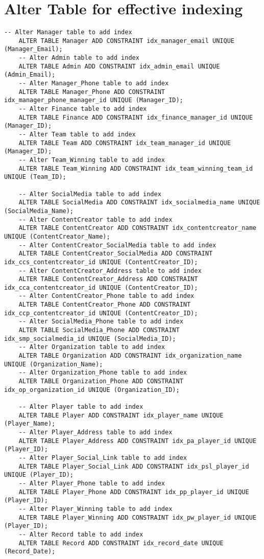 \section[Alter Table]{Alter Table for effective indexing}
\hrulefill
\begin{lstlisting}[caption={Alter Table},label={lst:alter-table}]
    -- Alter Manager table to add index
    ALTER TABLE Manager ADD CONSTRAINT idx_manager_email UNIQUE (Manager_Email);
    -- Alter Admin table to add index
    ALTER TABLE Admin ADD CONSTRAINT idx_admin_email UNIQUE (Admin_Email);
    -- Alter Manager_Phone table to add index
    ALTER TABLE Manager_Phone ADD CONSTRAINT idx_manager_phone_manager_id UNIQUE (Manager_ID);
    -- Alter Finance table to add index
    ALTER TABLE Finance ADD CONSTRAINT idx_finance_manager_id UNIQUE (Manager_ID);
    -- Alter Team table to add index
    ALTER TABLE Team ADD CONSTRAINT idx_team_manager_id UNIQUE (Manager_ID);
    -- Alter Team_Winning table to add index
    ALTER TABLE Team_Winning ADD CONSTRAINT idx_team_winning_team_id UNIQUE (Team_ID);
    
    -- Alter SocialMedia table to add index
    ALTER TABLE SocialMedia ADD CONSTRAINT idx_socialmedia_name UNIQUE (SocialMedia_Name);
    -- Alter ContentCreator table to add index
    ALTER TABLE ContentCreator ADD CONSTRAINT idx_contentcreator_name UNIQUE (ContentCreator_Name);
    -- Alter ContentCreator_SocialMedia table to add index
    ALTER TABLE ContentCreator_SocialMedia ADD CONSTRAINT idx_ccs_contentcreator_id UNIQUE (ContentCreator_ID);
    -- Alter ContentCreator_Address table to add index
    ALTER TABLE ContentCreator_Address ADD CONSTRAINT idx_cca_contentcreator_id UNIQUE (ContentCreator_ID);
    -- Alter ContentCreator_Phone table to add index
    ALTER TABLE ContentCreator_Phone ADD CONSTRAINT idx_ccp_contentcreator_id UNIQUE (ContentCreator_ID);
    -- Alter SocialMedia_Phone table to add index
    ALTER TABLE SocialMedia_Phone ADD CONSTRAINT idx_smp_socialmedia_id UNIQUE (SocialMedia_ID);
    -- Alter Organization table to add index
    ALTER TABLE Organization ADD CONSTRAINT idx_organization_name UNIQUE (Organization_Name);
    -- Alter Organization_Phone table to add index
    ALTER TABLE Organization_Phone ADD CONSTRAINT idx_op_organization_id UNIQUE (Organization_ID);
    
    -- Alter Player table to add index
    ALTER TABLE Player ADD CONSTRAINT idx_player_name UNIQUE (Player_Name);
    -- Alter Player_Address table to add index
    ALTER TABLE Player_Address ADD CONSTRAINT idx_pa_player_id UNIQUE (Player_ID);
    -- Alter Player_Social_Link table to add index
    ALTER TABLE Player_Social_Link ADD CONSTRAINT idx_psl_player_id UNIQUE (Player_ID);
    -- Alter Player_Phone table to add index
    ALTER TABLE Player_Phone ADD CONSTRAINT idx_pp_player_id UNIQUE (Player_ID);
    -- Alter Player_Winning table to add index
    ALTER TABLE Player_Winning ADD CONSTRAINT idx_pw_player_id UNIQUE (Player_ID);
    -- Alter Record table to add index
    ALTER TABLE Record ADD CONSTRAINT idx_record_date UNIQUE (Record_Date);
    

\end{lstlisting}
